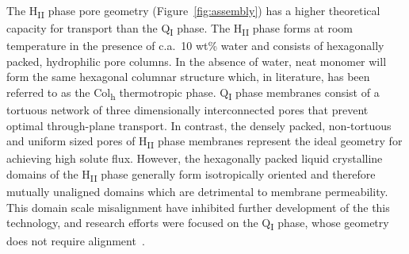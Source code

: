 \documentclass[journal=jpcbfk,manuscript=article]{achemso}
\begin{document}
  The H\textsubscript{II} phase pore geometry (Figure~\ref{fig:assembly}) has a
  higher theoretical capacity for transport than the Q\textsubscript{I} phase.
  The H\textsubscript{II} phase forms at room temperature in the presence of
  c.a.~10 wt\% water and consists of hexagonally packed, hydrophilic pore
  columns\cite{smith_ordered_1997}. In the absence of water, neat monomer will
  form the same hexagonal columnar structure which, in literature, has been
  referred to as the Col\textsubscript{h} thermotropic
  phase\cite{feng_scalable_2014}. 
  Q\textsubscript{I} phase membranes consist of a tortuous network of three
  dimensionally interconnected pores that prevent optimal through-plane
  transport. In contrast, the densely packed, non-tortuous and uniform sized
  pores of H\textsubscript{II} phase membranes represent the ideal geometry for
  achieving high solute flux\cite{matyka_tortuosity-porosity_2008}.  However, the
  hexagonally packed liquid crystalline domains of the H\textsubscript{II} phase
  generally form isotropically oriented and therefore mutually unaligned domains
  which are detrimental to membrane permeability. This domain scale misalignment
  have inhibited further development of the this technology, and research efforts
  were focused on the Q\textsubscript{I} phase, whose geometry does not require
  alignment~\cite{dischinger_papers}. 

\end{document}
